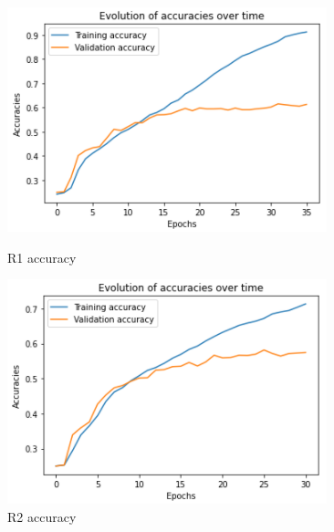 \documentclass[target=mst]{thud}
\begin{document}
\begin{figure}[h!]
    \centering
    \begin{minipage}[b]{0.48\textwidth}
      \centering
      \includegraphics[scale=0.85]{R1_accuracy.png}
      \caption{R1 accuracy}
      \label{fig:R1_accuracy}
    \end{minipage}
    \begin{minipage}[b]{0.48\textwidth}
      \centering
      \includegraphics[scale=0.85]{R2_accuracy.png}
      \caption{R2 accuracy}
      \label{fig:R2_accuracy}
    \end{minipage}
\end{figure}
\end{document}
